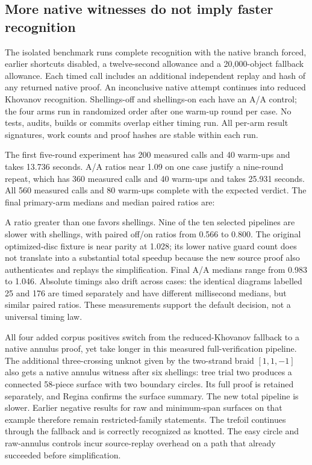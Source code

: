 \subsection{More native witnesses do not imply faster recognition}

The isolated benchmark runs complete recognition with the native branch
forced, earlier shortcuts disabled, a twelve-second allowance and a
20,000-object fallback allowance. Each timed call includes an additional
independent replay and hash of any returned native proof. An inconclusive
native attempt continues into reduced Khovanov recognition. Shellings-off
and shellings-on each have an A/A control; the four arms run in randomized
order after one warm-up round per case. No tests, audits, builds or commits
overlap either timing run. All per-arm result signatures, work counts and
proof hashes are stable within each run.

The first five-round experiment has 200 measured calls and 40 warm-ups and
takes 13.736 seconds. A/A ratios near 1.09 on one case justify a nine-round
repeat, which has 360 measured calls and 40 warm-ups and takes 25.931 seconds.
All 560 measured calls and 80 warm-ups complete with the expected verdict.
The final primary-arm medians and median paired ratios are:
\begin{center}
\small

\end{center}
A ratio greater than one favors shellings. Nine of the ten selected
pipelines are slower with shellings, with paired off/on ratios from 0.566
to 0.800. The original optimized-disc fixture is near parity at 1.028;
its lower native guard count does not translate into a substantial total
speedup because the new source proof also authenticates and replays the
simplification. Final A/A medians range from 0.983 to 1.046. Absolute timings
also drift across cases: the identical diagrams labelled 25 and 176 are timed
separately and have different millisecond medians, but similar paired ratios.
These measurements support the default decision, not a universal timing law.

All four added corpus positives switch from the reduced-Khovanov fallback to
a native annulus proof, yet take longer in this measured full-verification
pipeline. The additional three-crossing unknot given by the two-strand braid
$[1,1,-1]$ also gets a native annulus witness after six shellings: tree trial two
produces a connected 58-piece surface with two boundary circles. Its full
proof is retained separately, and Regina confirms the surface summary. The
new total pipeline is slower. Earlier negative results for raw and minimum-span surfaces on
that example therefore remain restricted-family statements. The trefoil
continues through the fallback and is correctly recognized as knotted.
The easy circle and raw-annulus controls incur source-replay overhead on a
path that already succeeded before simplification.

